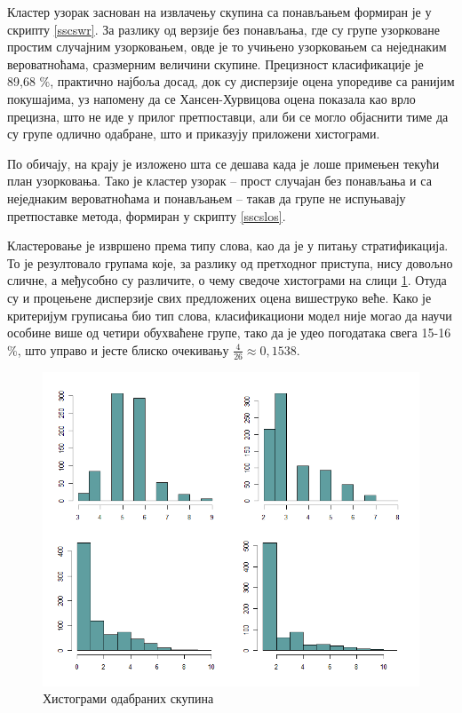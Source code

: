 \documentclass[a4paper]{article}
\begin{document}
Кластер узорак заснован на извлачењу скупина са понављањем формиран је у скрипту \ref{sscswr}. За разлику од верзије без понављања, где су групе узорковане простим случајним узорковањем, овде је то учињено узорковањем са неједнаким вероватноћама, сразмерним величини скупине. Прецизност класификације је 89,68 \%, практично најбоља досад, док су дисперзије оцена упоредиве са ранијим покушајима, уз напомену да се Хансен-Хурвицова оцена показала као врло прецизна, што не иде у прилог претпоставци, али би се могло објаснити тиме да су групе одлично одабране, што и приказују приложени хистограми.



По обичају, на крају је изложено шта се дешава када је лоше примењен текући план узорковања. Тако је кластер узорак -- прост случајан без понављања и са неједнаким вероватноћама и понављањем -- такав да групе не испуњавају претпоставке метода, формиран у скрипту \ref{sscslos}.



Кластеровање је извршено према типу слова, као да је у питању стратификација. То је резултовало групама које, за разлику од претходног приступа, нису довољно сличне, а међусобно су различите, о чему сведоче хистограми на слици \ref{skupl}. Отуда су и процењене дисперзије свих предложених оцена вишеструко веће. Како је критеријум груписања био тип слова, класификациони модел није могао да научи особине више од четири обухваћене групе, тако да је удео погодатака свега 15-16 \%, што управо и јесте блиско очекивању $\frac{4}{26} \approx 0,1538$.

\begin{figure}[h!]
\begin{center}
\includegraphics[scale=0.57]{../Slike za rad/Skupinel.png}
\end{center}
\caption{Хистограми одабраних скупина}
\label{skupl}
\end{figure}
\end{document}
